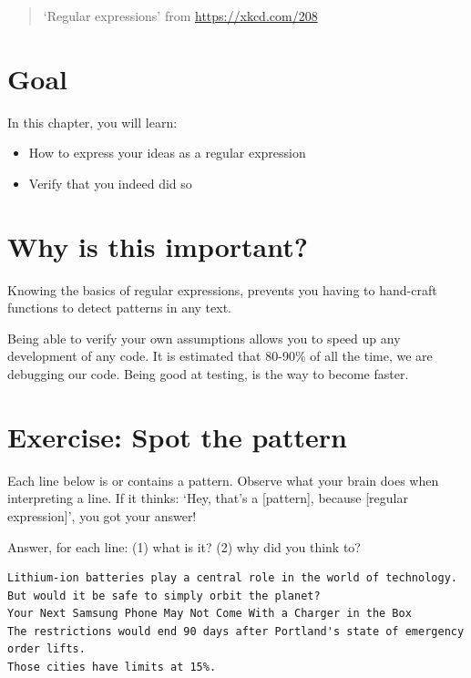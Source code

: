 \documentclass[]{book}
\providecommand{\tightlist}{%
  \setlength{\itemsep}{0pt}\setlength{\parskip}{0pt}}
\begin{document}
\begin{quote}
`Regular expressions' from \url{https://xkcd.com/208}
\end{quote}

\hypertarget{goal}{%
\section{Goal}\label{goal}}

In this chapter, you will learn:

\begin{itemize}
\tightlist
\item
  How to express your ideas as a regular expression
\item
  Verify that you indeed did so
\end{itemize}

\hypertarget{why-is-this-important}{%
\section{Why is this important?}\label{why-is-this-important}}

Knowing the basics of regular expressions, prevents you having
to hand-craft functions to detect patterns in any text.

Being able to verify your own assumptions allows you to speed
up any development of any code. It is estimated that 80-90\%
of all the time, we are debugging our code. Being good at
testing, is the way to become faster.

\hypertarget{exercise-spot-the-pattern}{%
\section{Exercise: Spot the pattern}\label{exercise-spot-the-pattern}}

Each line below is or contains a pattern. Observe what your brain does
when interpreting a line. If it thinks: `Hey, that's a {[}pattern{]},
because {[}regular expression{]}', you got your answer!

Answer, for each line: (1) what is it? (2) why did you think to?

\begin{verbatim}
Lithium-ion batteries play a central role in the world of technology.
But would it be safe to simply orbit the planet?
Your Next Samsung Phone May Not Come With a Charger in the Box
The restrictions would end 90 days after Portland's state of emergency order lifts. 
Those cities have limits at 15%.
\end{verbatim}
\end{document}
